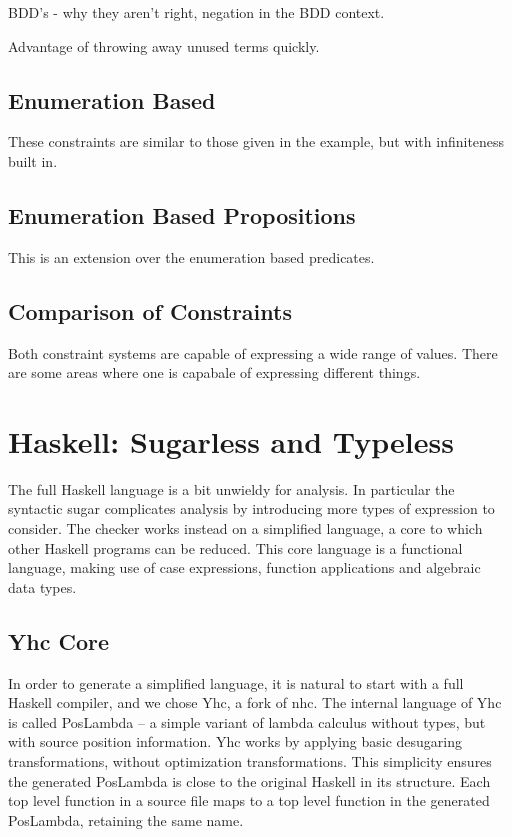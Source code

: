 \documentclass[preprint]{sigplanconf}
\begin{document}
BDD's - why they aren't right, negation in the BDD context.

Advantage of throwing away unused terms quickly.



\subsection{Enumeration Based}

These constraints are similar to those given in the example, but with infiniteness built in.

\subsection{Enumeration Based Propositions}

This is an extension over the enumeration based predicates.

\subsection{Comparison of Constraints}

Both constraint systems are capable of expressing a wide range of values. There are some areas where one is capabale of expressing different things.





\section{Haskell: Sugarless and Typeless}
\label{sec:transform}

The full Haskell language is a bit unwieldy for analysis. In particular the
syntactic sugar complicates analysis by introducing more types of expression to
consider. The checker works instead on a simplified language, a core to which
other Haskell programs can be reduced. This core language is a functional
language, making use of case expressions, function applications and algebraic
data types.

\subsection{Yhc Core}

In order to generate a simplified language, it is natural to start with a full
Haskell compiler, and we chose Yhc, a fork of nhc. The internal language of Yhc
is called PosLambda -- a simple variant of lambda calculus without types, but
with source position information. Yhc works by applying basic desugaring
transformations, without optimization transformations. This simplicity ensures
the generated PosLambda is close to the original Haskell in its structure. Each
top level function in a source file maps to a top level function in the
generated PosLambda, retaining the same name.
\end{document}
